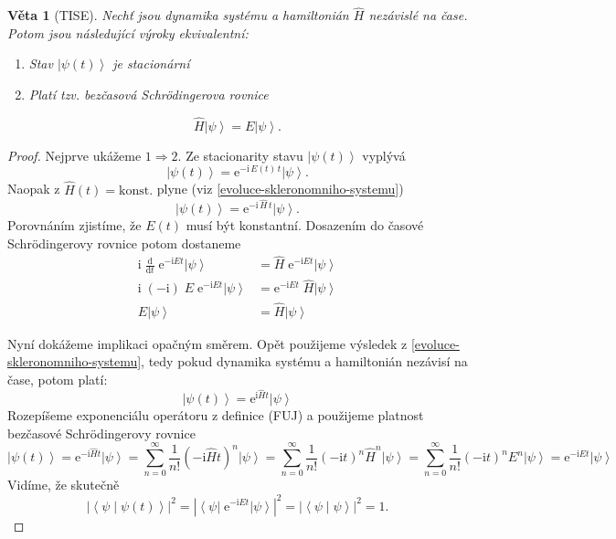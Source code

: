 \documentclass[10pt,a4paper]{article}
\newtheorem{theorem}{Věta}[section]
\theoremstyle{definition}
\newcommand{\const}[1]{\mathrm{#1}}
\newcommand{\abs}[1]{\left| #1 \right|}
\newcommand{\dd}[2]{\frac{\const{d} #1}{\const{d} #2} \;}
\newcommand{\bra}[1]{\left< #1 \right|}
\newcommand{\ket}[1]{\left| #1 \right>}
\newcommand{\braket}[2]{\left< #1 \middle| #2 \right>}
\newcommand{\e}[1]{\const{e}^{#1}}
\renewcommand{\i}{\const{i}}
\def\konst{\mathrm{konst.}}
\begin{document}
\begin{theorem}[TISE]
    Nechť jsou dynamika systému a hamiltonián $\hat H$ nezávislé na čase. Potom jsou následující výroky ekvivalentní:
    \begin{enumerate}
        \item Stav $\ket{\psi(t)}$ je stacionární
        \item Platí tzv. bezčasová Schrödingerova rovnice
    \end{enumerate}
    \begin{equation*}
        \hat{H} \ket{\psi} = E \ket{\psi}.
    \end{equation*}
\end{theorem}
\begin{proof}
    Nejprve ukážeme $1 \Rightarrow 2$. Ze stacionarity stavu $\ket{\psi(t)}$ vyplývá
    \begin{equation*}
        \ket{\psi(t)} = \e{-\i \, E(t) \, t} \ket{\psi}.
    \end{equation*}
    Naopak z $\hat H(t) = \konst$ plyne (viz \ref{evoluce-skleronomniho-systemu})
    \begin{equation*}
        \ket{\psi(t)} = \e{-\i \, \hat H \, t} \ket{\psi}.
    \end{equation*}
    Porovnáním zjistíme, že $E(t)$ musí být konstantní. Dosazením do časové Schrödingerovy rovnice potom dostaneme
    \begin{align*}
        \i \; \dd{}{t} \! \e{-\i E t} \ket{\psi}
        &= \hat H \; \e{-\i E t} \ket{\psi}
        \\
        \i \; (-\i) \; E \; \e{-\i E t} \ket{\psi}
        &= \e{-\i E t} \; \hat H \ket{\psi}
        \\
        E \ket{\psi}
        &= \hat H \ket{\psi}
    \end{align*}

    Nyní dokážeme implikaci opačným směrem. Opět použijeme výsledek z \ref{evoluce-skleronomniho-systemu}, tedy pokud dynamika systému a hamiltonián nezávisí na čase, potom platí:
    \begin{equation*}
        \ket{\psi(t)} = \e{\i \hat H t} \ket{\psi}
    \end{equation*}
    Rozepíšeme exponenciálu operátoru z definice (FUJ) a použijeme platnost bezčasové Schrödingerovy rovnice
    \begin{equation*}
        \ket{\psi(t)}
        = \e{-\i \hat H t} \ket{\psi}
        = \sum_{n = 0}^\infty \frac{1}{n!} (-\i \hat H t)^n \ket{\psi}
        = \sum_{n = 0}^\infty \frac{1}{n!} (-\i t)^n \hat H^n \ket{\psi}
        = \sum_{n = 0}^\infty \frac{1}{n!}(-\i t)^n E^n \ket{\psi}
        = \e{-\i E t} \ket{\psi}
    \end{equation*}
    Vidíme, že skutečně
    \begin{equation*}
        \abs{\braket{\psi}{\psi(t)}}^2
        = \abs{\bra{\psi} \; \e{-\i E t} \ket{\psi}}^2
        = \abs{\braket{\psi}{\psi}}^2
        = 1.
    \end{equation*}
\end{proof}
\end{document}
